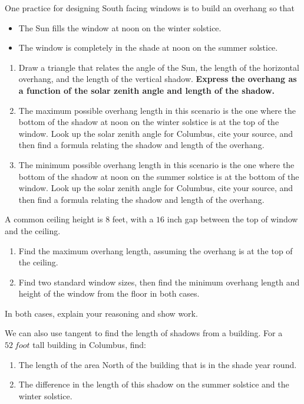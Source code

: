 \documentclass[noauthor,nooutcomes,handout,hints,12pt]{ximera}
\begin{document}
\mynewpage


\begin{question}
 One practice for designing South facing windows is to build an
 overhang so that
 \begin{itemize}
 \item The Sun fills the window at noon on the winter solstice.
 \item The window is completely in the shade at noon on the summer
   solstice.
 \end{itemize}
\begin{enumerate}
\item Draw a triangle that relates the angle of the Sun, the length of
  the horizontal overhang, and the length of the vertical shadow.
  \textbf{Express the overhang as a function of the solar zenith angle and length of the shadow.}
\item The maximum possible overhang length in this scenario is the one
  where the bottom of the shadow at noon on the winter solstice is at
  the top of the window. Look up the solar zenith angle for Columbus,
  cite your source, and then find a formula relating the shadow and
  length of the overhang. 
\item The minimum possible overhang length in this scenario is the one
  where the bottom of the shadow at noon on the summer solstice is at
  the bottom of the window. Look up the solar zenith angle for Columbus, cite
  your source, and then find a formula relating the shadow and length
  of the overhang. 
\end{enumerate}
\end{question}
\mynewpage


\begin{question}
 A common ceiling height is $8$ feet, with a $16$ inch gap between the
 top of window and the ceiling.
 
\begin{enumerate}
 \item Find the maximum overhang length, assuming the overhang is at
   the top of the ceiling.
 \item Find two standard window sizes, then find the minimum overhang
   length and height of the window from the floor in both cases.
\end{enumerate}
In both cases, explain your reasoning and show work.
\end{question}
\mynewpage

\begin{question}
 We can also use tangent to find the length of shadows from a
 building. For a $52\ foot$ tall building in Columbus, find:
 
\begin{enumerate}
 \item The length of the area North of the building that is in the
   shade year round.
 \item The difference in the length of this shadow on the summer
   solstice and the winter solstice.
\end{enumerate}
\end{question}
\end{document}
